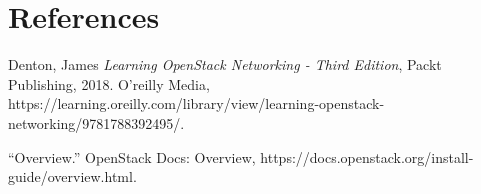 \documentclass{article}
\begin{document}
\newpage


\section{References}

Denton, James \textit{Learning OpenStack Networking - Third Edition}, Packt Publishing, 2018. O'reilly Media, https://learning.oreilly.com/library/view/learning-openstack-networking/9781788392495/.\par

“Overview.” OpenStack Docs: Overview, 
https://docs.openstack.org/install-guide/overview.html.
\end{document}
